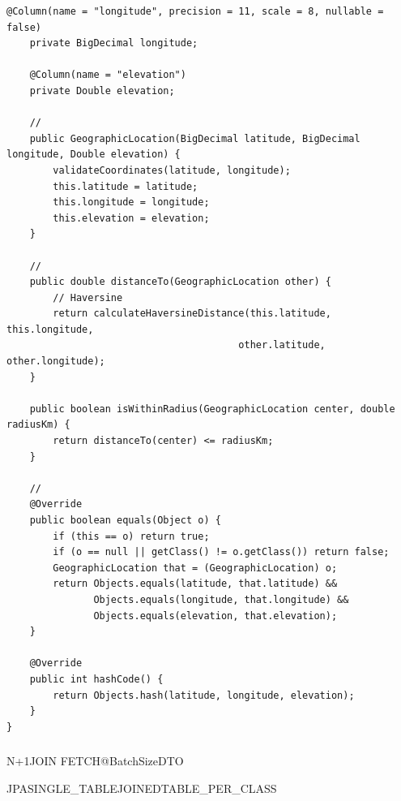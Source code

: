 \begin{lstlisting}[style=java]
    @Column(name = "longitude", precision = 11, scale = 8, nullable = false)
    private BigDecimal longitude;
    
    @Column(name = "elevation")
    private Double elevation;
    
    // 
    public GeographicLocation(BigDecimal latitude, BigDecimal longitude, Double elevation) {
        validateCoordinates(latitude, longitude);
        this.latitude = latitude;
        this.longitude = longitude;
        this.elevation = elevation;
    }
    
    // 
    public double distanceTo(GeographicLocation other) {
        // Haversine
        return calculateHaversineDistance(this.latitude, this.longitude, 
                                        other.latitude, other.longitude);
    }
    
    public boolean isWithinRadius(GeographicLocation center, double radiusKm) {
        return distanceTo(center) <= radiusKm;
    }
    
    // 
    @Override
    public boolean equals(Object o) {
        if (this == o) return true;
        if (o == null || getClass() != o.getClass()) return false;
        GeographicLocation that = (GeographicLocation) o;
        return Objects.equals(latitude, that.latitude) &&
               Objects.equals(longitude, that.longitude) &&
               Objects.equals(elevation, that.elevation);
    }
    
    @Override
    public int hashCode() {
        return Objects.hash(latitude, longitude, elevation);
    }
}
\end{lstlisting}

\hypertarget{section-69}{%
\subsubsection{}\label{section-69}}

\important{}N+1JOIN FETCH@BatchSizeDTO

\important{}

\important{}JPASINGLE\_TABLEJOINEDTABLE\_PER\_CLASS


